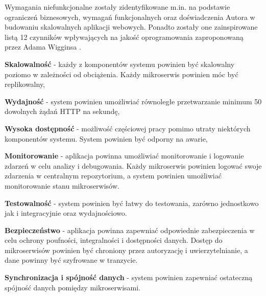 Wymagania niefunkcjonalne zostały zidentyfikowane m.in. na podstawie ograniczeń biznesowych, wymagań funkcjonalnych oraz doświadczenia Autora w budowaniu skalowalnych aplikacji webowych. Ponadto zostały one zainspirowane listą 12 czynników wpływających na jakość oprogramowania zaproponowaną przez Adama Wigginsa \cite{12factors}.

\textbf{Skalowalność} - każdy z komponentów systemu powinien być skalowalny poziomo w zależności od obciążenia. Każdy mikroserwis powinien móc być replikowalny,

\textbf{Wydajność} - system powinien umożliwiać równoległe przetwarzanie minimum 50 dowolnych żądań HTTP na sekundę,

\textbf{Wysoka dostępność} - możliwość częściowej pracy pomimo utraty niektórych komponentów systemu. System powinien być odporny na awarie,

\textbf{Monitorowanie} - aplikacja powinna umożliwiać monitorowanie i logowanie zdarzeń w celu analizy i debugowania. Każdy mikroserwis powinien logować swoje zdarzenia w centralnym repozytorium, a system powinien umożliwiać monitorowanie stanu mikroserwisów.

\textbf{Testowalność} - system powinien być łatwy do testowania, zarówno jednostkowo jak i integracyjnie oraz wydajnościowo.

\textbf{Bezpieczeństwo} - aplikacja powinna zapewniać odpowiednie zabezpieczenia w celu ochrony poufności, integralności i dostępności danych. Dostęp do mikroserwisów powinien być chroniony przez autoryzację i uwierzytelnianie, a dane powinny być szyfrowane w tranzycie.

\textbf{Synchronizacja i spójność danych} - system powinien zapewniać ostateczną spójność danych pomiędzy mikroserwisami.